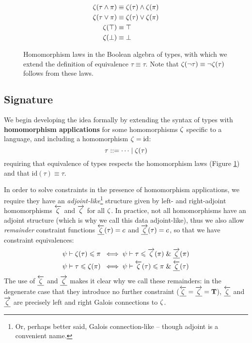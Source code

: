 \begin{figure}
    \centering
    \begin{align*}
        \zeta(\tau \land \pi) &\equiv \zeta(\tau) \land \zeta(\pi) \\
        \zeta(\tau \lor \pi) &\equiv \zeta(\tau) \lor \zeta(\pi) \\
        \zeta(\top) &\equiv \top \\
        \zeta(\bot) &\equiv \bot
    \end{align*}
    \caption{Homomorphism laws in the Boolean algebra of types, with which we extend the definition of equivalence $\tau \equiv \tau$. Note that $\zeta(\lnot \tau) \equiv \lnot \zeta(\tau)$ follows from these laws.}
    \label{fig:morphism-laws}
\end{figure}

\subsection{Signature}

We begin developing the idea formally by extending the syntax of types with \textbf{homomorphism applications} for some homomorphisms $\zeta$ specific to a language, and including a homomorphism $\zeta = \mathrm{id}$:
$$ \tau ::= \cdots \mid \zeta(\tau) $$
requiring that equivalence of types respects the homomorphism laws (Figure \ref{fig:morphism-laws}) and that $\mathrm{id}(\tau) \equiv \tau$. 

In order to solve constraints in the presence of homomorphism applications, we require they have an \emph{adjoint-like}\footnote{Or, perhaps better said, Galois connection-like -- though adjoint is a convenient name.} structure given by left- and right-adjoint homomorphisms $\overleftarrow{\zeta}$ and $\overrightarrow{\zeta}$ for all $\zeta$. In practice, not all homomorphisms have an adjoint structure (which is why we call this data adjoint-like), thus we also allow \emph{remainder} constraint functions $\underline{\overleftarrow{\zeta}}(\tau) = c$ and $\underline{\overrightarrow{\zeta}}(\tau) = c$, so that we have constraint equivalences:
\begin{align*}
\psi \vdash \zeta(\tau) \leqslant \pi &\;\iff \psi \vdash \tau \leqslant \overrightarrow{\zeta}(\pi) \;\&\; \underline{\overrightarrow{\zeta}}(\pi) \\
\psi \vdash \tau \leqslant \zeta(\pi) &\;\iff \psi \vdash \overleftarrow{\zeta}(\tau) \leqslant \pi \;\&\; \underline{\overleftarrow{\zeta}}(\tau)
\end{align*}
The use of $\underline{\overleftarrow{\zeta}}$ and $\underline{\overrightarrow{\zeta}}$ makes it clear why we call these remainders: in the degenerate case that they introduce no further constraint ($\underline{\overleftarrow{\zeta}} = \underline{\overrightarrow{\zeta}} = \mathbf T$), $\underline{\overleftarrow{\zeta}}$ and $\underline{\overrightarrow{\zeta}}$ are precisely left and right Galois connections to $\zeta$.

